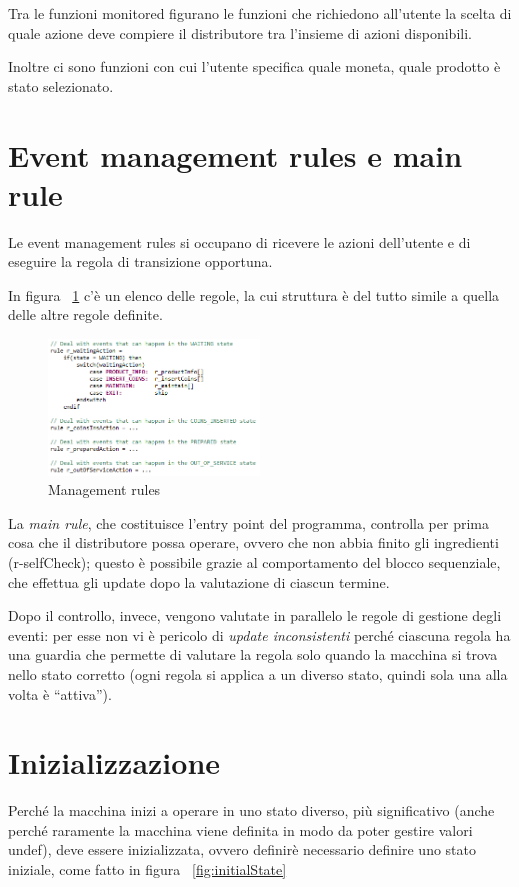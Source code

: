 Tra le funzioni monitored figurano le funzioni che richiedono all’utente la scelta di quale azione deve compiere il distributore tra l'insieme di azioni disponibili.

Inoltre ci sono funzioni con cui l’utente specifica quale moneta, quale prodotto è stato selezionato.

\section{Event management rules e main rule}
Le event management rules si occupano di ricevere le azioni dell’utente e di eseguire la regola di transizione opportuna. 

In figura ~\ref{fig:managementRules} c’è un elenco delle regole, la cui struttura è del tutto simile a quella delle altre regole definite.

\begin{figure}[h]
	\centering
	\includegraphics[width=0.5\textwidth]{Immagini/ManagementRule.png}
	\caption{Management rules}
	\label{fig:managementRules}
\end{figure}

La \textit{main rule}, che costituisce l’entry point del programma, controlla per prima cosa che il distributore possa operare, ovvero che non abbia finito gli ingredienti (r-selfCheck); questo è possibile grazie al comportamento del blocco sequenziale, che effettua gli update dopo la valutazione di ciascun termine.

Dopo il controllo, invece, vengono valutate in parallelo le regole di gestione degli eventi: per esse non vi è pericolo di \textit{update inconsistenti} perché ciascuna regola ha una guardia che permette di valutare la regola solo quando la macchina si trova nello stato corretto (ogni regola si applica a un diverso stato, quindi sola una alla volta è “attiva”).

\section{Inizializzazione}
Perché la macchina inizi a operare in uno stato diverso, più significativo (anche perché raramente la macchina viene definita in modo da poter gestire valori undef), deve essere inizializzata, ovvero definirè necessario definire uno stato iniziale, come fatto in figura ~\ref{fig:initialState}

